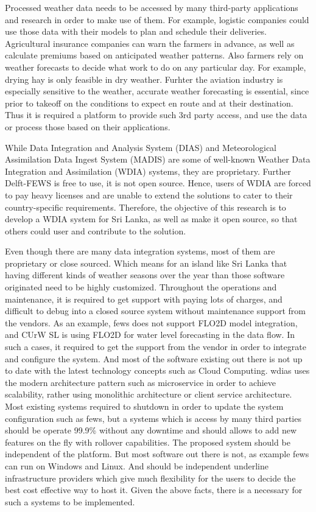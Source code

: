 Processed weather data needs to be accessed by many third-party applications and research in order to make use of them. For example, logistic companies could use those data with their models to plan and schedule their deliveries. Agricultural insurance companies can warn the farmers in advance, as well as calculate premiums based on anticipated weather patterns. Also farmers rely on weather forecasts to decide what work to do on any particular day. For example, drying hay is only feasible in dry weather. Furhter the aviation industry is especially sensitive to the weather, accurate weather forecasting is essential, since prior to takeoff on the conditions to expect en route and at their destination. 
Thus it is required a platform to provide such 3rd party access, and use the data or process those based on their applications.

While Data Integration and Analysis System (DIAS) and Meteorological Assimilation Data Ingest System (MADIS) are some of well-known Weather Data Integration and Assimilation (WDIA) systems, they are proprietary. Further Delft-FEWS is free to use, it is not open source. Hence, users of WDIA are forced to pay heavy licenses and are unable to extend the solutions to cater to their country-specific requirements. Therefore, the objective of this research is to develop a WDIA system for Sri Lanka, as well as make it open source, so that others could user and contribute to the solution.

Even though there are many data integration systems, most of them are proprietary or close sourced. Which means for an island like Sri Lanka that having different kinds of weather seasons over the year than those software originated need to be highly customized. Throughout the operations and maintenance, it is required to get support with paying lots of charges, and difficult to debug into a closed source system without maintenance support from the vendors. As an example, \acrshort{fews} does not support FLO2D model integration, and CUrW SL is using FLO2D for water level forecasting in the data flow. In such a cases, it required to get the support from the vendor in order to integrate and configure the system.
And most of the software existing out there is not up to date with the latest technology concepts such as Cloud Computing. \acrfull{wdias} uses the modern architecture pattern such as microservice in order to achieve scalability, rather using monolithic architecture or client service architecture. Most existing systems required to shutdown in order to update the system configuration such as \acrshort{fews}, but a systems which is access by many third parties should be operate 99.9\% without any downtime and should allows to add new features on the fly with rollover capabilities. The proposed system should be independent of the platform. But most software out there is not, as example \acrshort{fews} can run on Windows and Linux. And should be independent underline infrastructure providers which give much flexibility for the users to decide the best cost effective way to host it. Given the above facts, there is a necessary for such a systems to be implemented.
